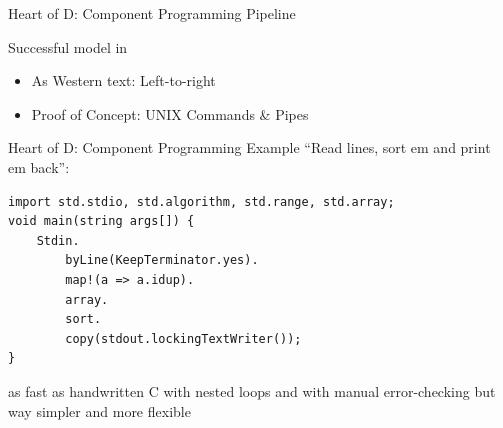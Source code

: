 \documentclass[xcolor=dvipsnames]{beamer}
\begin{document}
\begin{frame}[fragile]{Heart of D: Component Programming Pipeline}
  \begin{figure}
  \end{figure}
  Successful model in
  \begin{itemize}[<+->]
  \item As Western text: Left-to-right
  \item Proof of Concept: UNIX Commands \& Pipes
  \end{itemize}
\end{frame}

\begin{frame}[fragile]{Heart of D: Component Programming Example}
  ``Read lines, sort em and print em back'':
\begin{lstlisting}[frame=single]
import std.stdio, std.algorithm, std.range, std.array;
void main(string args[]) {
    Stdin.
        byLine(KeepTerminator.yes).
        map!(a => a.idup).
        array.
        sort.
        copy(stdout.lockingTextWriter());
}
\end{lstlisting}
as fast as handwritten C with nested loops and with manual error-checking but
way simpler and more flexible
\end{frame}
\end{document}
